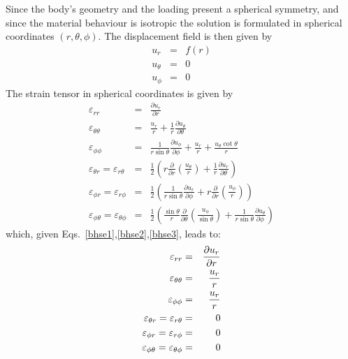 Since the body's geometry and the loading present a spherical symmetry, and since the material
behaviour is isotropic the solution is formulated in spherical coordinates $(r,\theta,\phi)$.
The displacement field is then given by
\begin{eqnarray}
u_r &=& f(r) \label{bhse1}\\
u_\theta &=& 0 \label{bhse2}\\
u_\phi &=& 0  \label{bhse3}
\end{eqnarray}
The strain tensor in spherical coordinates is given by
\begin{eqnarray}
\varepsilon_{rr} 
&=& \frac{\partial u_r}{\partial r} \nonumber\\
\varepsilon_{\theta\theta} 
&=& \frac{u_r}{r} + \frac{1}{r} \frac{\partial u_\theta}{\partial \theta}  \nonumber\\
\varepsilon_{\phi\phi} 
&=& \frac{1}{r \sin\theta} \frac{\partial u_\phi}{\partial \phi} +
\frac{u_r}{r} +\frac{u_\theta \cot \theta}{r} \nonumber\\
\varepsilon_{\theta r} = \varepsilon_{r\theta}   
&=& \frac{1}{2} \left( r \frac{\partial}{\partial r} (\frac{u_\theta}{r} ) 
+\frac{1}{r} \frac{\partial u_r}{\partial \theta} \right) \nonumber\\
\varepsilon_{\phi r} = \varepsilon_{r\phi}      
&=&  \frac{1}{2} \left(  \frac{1}{r \sin\theta} \frac{\partial u_r}{\partial \phi} 
+ r \frac{\partial }{\partial r} (\frac{u_\phi}{r}) \right)  \nonumber\\
\varepsilon_{\phi \theta} = \varepsilon_{\theta\phi} 
&=& \frac{1}{2} \left( \frac{\sin \theta}{r} \frac{\partial }{\partial \theta} (\frac{u_\phi}{\sin\theta}) + \frac{1}{r \sin\theta} \frac{\partial u_\theta}{\partial \phi}    \right) \nonumber
\end{eqnarray}
which, given Eqs.~\eqref{bhse1},\eqref{bhse2},\eqref{bhse3}, leads to:
\begin{eqnarray}
\varepsilon_{rr}  &=& \frac{\partial u_r}{\partial r}  \nonumber\\
\varepsilon_{\theta\theta} &=& \frac{u_r}{r}   \nonumber\\
\varepsilon_{\phi\phi} &=& \frac{u_r}{r}   \nonumber\\
\varepsilon_{\theta r} = \varepsilon_{r\theta}   
&=& 0 \nonumber\\ 
\varepsilon_{\phi r} = \varepsilon_{r\phi}      
&=& 0 \nonumber\\ 
\varepsilon_{\phi \theta} = \varepsilon_{\theta\phi} &=& 0 \nonumber
\end{eqnarray}
